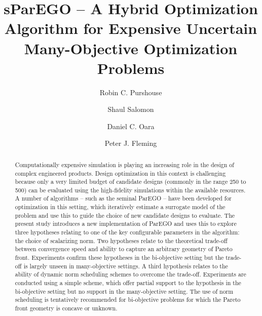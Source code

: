\documentclass[10pt]{llncs}
\begin{document}
\title{sParEGO -- A Hybrid Optimization Algorithm for Expensive Uncertain Many-Objective Optimization Problems}
\author{Robin C. Purshouse \and Shaul Salomon \and Daniel C. Oara \and Peter J. Fleming}

\maketitle

\begin{abstract}
Computationally expensive simulation is playing an increasing role in the design of complex engineered products. Design optimization in this context is challenging because only a very limited budget of candidate designs (commonly in the range 250 to 500) can be evaluated using the high-fidelity simulations within the available resources. A number of algorithms -- such as the seminal ParEGO -- have been developed for optimization in this setting, which iteratively estimate a surrogate model of the problem and use this to guide the choice of new candidate designs to evaluate. The present study introduces a new implementation of ParEGO and uses this to explore three hypotheses relating to one of the key configurable parameters in the algorithm: the choice of scalarizing norm. Two hypotheses relate to the theoretical trade-off between convergence speed and ability to capture an arbitrary geometry of Pareto front. Experiments confirm these hypotheses in the bi-objective setting but the trade-off is largely unseen in many-objective settings. A third hypothesis relates to the ability of dynamic norm scheduling schemes to overcome the trade-off. Experiments are conducted using a simple scheme, which offer partial support to the hypothesis in the bi-objective setting but no support in the many-objective setting. The use of norm scheduling is tentatively recommended for bi-objective problems for which the Pareto front geometry is concave or unknown.
\end{abstract}
\end{document}
